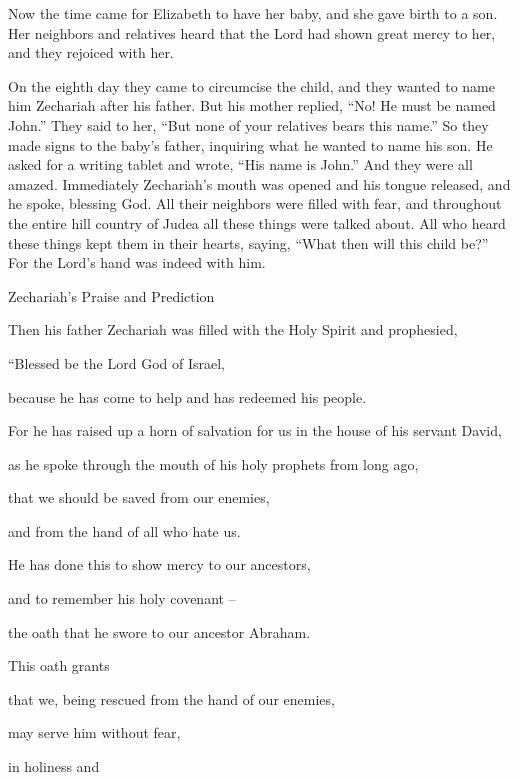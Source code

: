 {\par }{\PP {}Now
the time
came
for Elizabeth
to have
her
baby,
and
she gave birth
to a son.
Her
neighbors
and
relatives
heard
that
the Lord
had shown great
mercy
to
her,
and
they rejoiced
with her.
\par }{\PP {}On
the eighth
day
they came
to circumcise
the child,
and
they wanted
to
name
him
Zechariah
after his
father.
But
his
mother
replied, “No! He
must
be named
John.”
They said
to
her,
“But none
of
your
relatives
bears
this
name.”
So
they made signs
to the baby’s
father,
inquiring what
he wanted
to name
his son.
He
asked for
a writing tablet
and wrote, “His
name
is
John.”
And
they were
all
amazed.
Immediately
Zechariah’s
mouth
was opened
and
his
tongue
released, and
he spoke,
blessing
God.
All
their
neighbors
were filled with
fear,
and
throughout
the entire hill country
of Judea
all
these
things
were talked about.
All
who heard
these things
kept
them in
their
hearts,
saying,
“What
then
will
this
child
be?” For
the Lord’s
hand
was
indeed with
him.
\par }{\SH Zechariah’s Praise and Prediction
\par }{\PP {}Then
his
father
Zechariah
was filled
with the Holy
Spirit
and
prophesied,
\par }{\Q {}“Blessed
be the Lord
God
of Israel,
\par }{\Q because
he has come
to help
and
has redeemed
his
people.
\par }{\Q {}For he has raised up
a horn
of salvation
for us
in
the house
of his
servant
David,
\par }{\Q {}as
he spoke
through
the mouth
of his
holy
prophets
from
long ago,
\par }{\Q {}that we should be saved
from
our
enemies,
\par }{\Q and
from
the hand
of all
who hate
us.
\par }{\Q {}He has done
this to show mercy
to our
ancestors,
\par }{\Q and
to remember
his
holy
covenant –
\par }{\Q {}the oath
that
he swore
to
our
ancestor
Abraham.
\par }{\Q This oath grants
\par }{\Q {}that we, being rescued
from
the hand
of
our enemies,
\par }{\Q may serve
him
without fear,
\par }{\Q {}in
holiness
and
}
